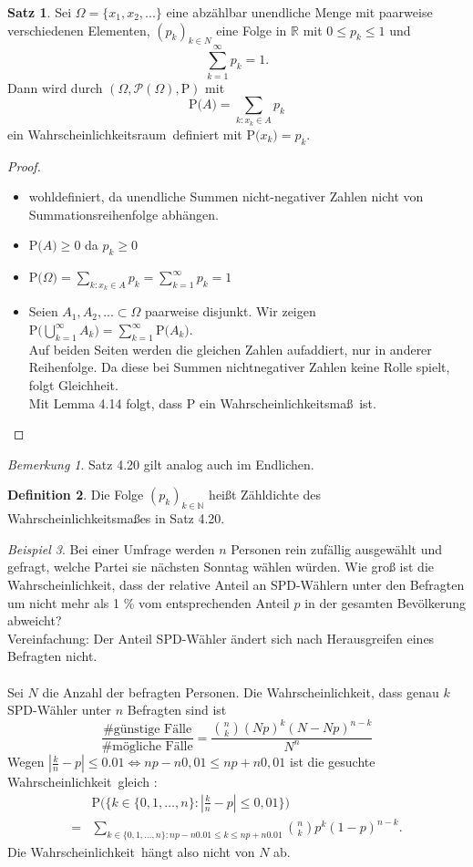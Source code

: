 \documentclass[a4paper,12pt,fleqn]{scrartcl}
\newcommand{\N}{\mathbb{N}}
\newcommand{\R}{\mathbb{R}}
\newcommand{\m}[1]{\mathcal{ #1 }}
\newcommand{\p}[1]{\text{P(} #1 \text{)}}
\newcommand{\WR}{Wahrscheinlichkeitsraum}
\newcommand{\WM}{Wahrscheinlichkeitsmaß}
\newcommand{\Wk}{Wahrscheinlichkeit}
\theoremstyle{definition}
\newtheorem{definition}{Definition}[section]
\newtheorem{satz}[definition]{Satz}
\theoremstyle{plain}
\theoremstyle{remark}
\newtheorem*{bemerkung}{Bemerkung}
\newtheorem{beispiel}[definition]{Beispiel}
\begin{document}
\begin{satz}
Sei $\Omega = \{ x_1,x_2,... \}$ eine abzählbar unendliche Menge mit paarweise verschiedenen Elementen, $(p_k)_{k \in N}$ eine Folge in $\R$ mit $0 \leq p_k \leq 1$ und
\[\sum_{k=1}^{\infty}{p_k} = 1.\]	 
Dann wird durch $( \Omega , \m{P}(\Omega)  , \text{P})$ mit 
\[\p{A} = \sum_{k:x_k \in A}{p_k}\]
ein \WR \, definiert mit $\p{x_k} = p_k.$
\end{satz}
\begin{proof}
\begin{itemize}
\item wohldefiniert, da unendliche Summen nicht-negativer Zahlen nicht von Summationsreihenfolge abhängen.
\item $\p{A} \geq 0$ da $p_k \geq 0$
\item $\p{ \Omega } = \sum_{k:x_k \in A}{p_k} = \sum_{k=1}^{\infty}{p_k} = 1$
\item Seien $A_1, A_2,... \subset \Omega $ paarweise disjunkt. Wir zeigen $ \p{ \bigcup_{k=1}^{ \infty }{A_k} } = \sum_{k=1}^{\infty}{\p{A_k}}$.\\ 
Auf beiden Seiten werden die gleichen Zahlen aufaddiert, nur in anderer Reihenfolge. Da diese bei Summen nichtnegativer Zahlen keine Rolle spielt, folgt Gleichheit. \\
Mit Lemma 4.14 folgt, dass P ein \WM \, ist.
\end{itemize}
\end{proof}
\begin{bemerkung}
Satz 4.20 gilt analog auch im Endlichen.
\end{bemerkung}
\begin{definition}
Die Folge $(p_k)_{k \in \N}$ heißt Zähldichte des \WM es in Satz 4.20.
\end{definition}
\begin{beispiel}
Bei einer Umfrage werden $n$ Personen rein zufällig ausgewählt und gefragt, welche Partei sie nächsten Sonntag wählen würden. Wie groß ist die \Wk , dass der relative Anteil an SPD-Wählern unter den Befragten um nicht mehr als 1 \% vom entsprechenden Anteil $p$ in der gesamten Bevölkerung abweicht? \\
Vereinfachung: Der Anteil SPD-Wähler ändert sich nach Herausgreifen eines Befragten nicht. \\ \\
Sei $N$ die Anzahl der befragten Personen. Die \Wk , dass genau $k$ SPD-Wähler unter $n$ Befragten sind ist
\[\frac{\text{\# günstige Fälle}}{\text{\# mögliche Fälle}} = \frac{\binom{n}{k} (Np)^k (N-Np)^{n-k}}{N^n}\]
Wegen $|\frac{k}{n} - p | \leq 0.01 \iff np-n0,01 \leq np + n0,01$ ist die gesuchte \Wk \, gleich :
\begin{align*}
&\p{ \{ k \in \{ 0,1, \ldots ,n \} : |\frac{k}{n} -p| \leq 0,01 \}} \\
=& \sum_{k \in \{ 0,1, \ldots ,n \}: np-n0.01 \leq k \leq np+n0.01}{  \binom{n}{k} p^k (1-p)^{n-k}}.
\end{align*}
Die \Wk \, hängt also nicht von $N$ ab.
\end{beispiel}
\end{document}
